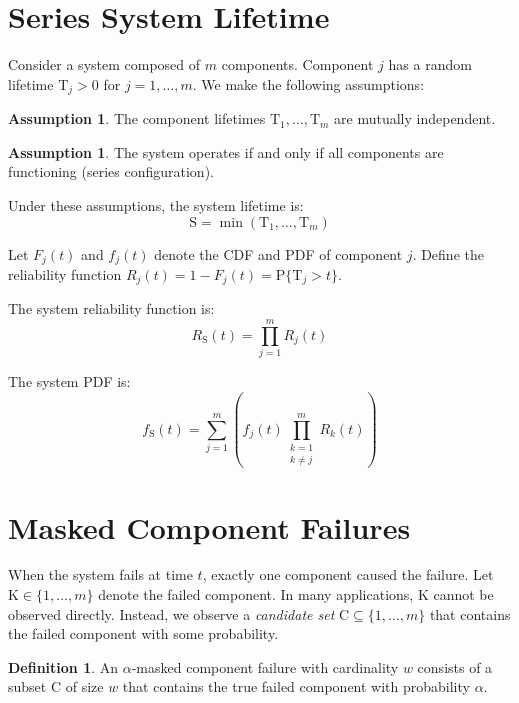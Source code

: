 \documentclass[12pt]{article}
\newcommand{\RV}[1]{\mathrm{#1}}
\newcommand{\Prob}[1]{\mathrm{P}\{#1\}}
\newcommand{\cv}{\RV{T}}           %
\newcommand{\sv}{\RV{S}}           %
\newcommand{\cand}{\RV{C}}         %
\newcommand{\pdf}{f}
\newcommand{\cdf}{F}
\newcommand{\srv}{R}
\newcommand{\spdf}{\pdf_{\sv}}
\theoremstyle{definition}
\newtheorem{definition}[theorem]{Definition}
\newtheorem{assumption}[theorem]{Assumption}
\begin{document}
\section{Series System Lifetime}

Consider a system composed of $m$ components. Component $j$ has a random lifetime $\cv_j > 0$ for $j = 1, \ldots, m$. We make the following assumptions:

\begin{assumption}
\label{asm:indep}
The component lifetimes $\cv_1, \ldots, \cv_m$ are mutually independent.
\end{assumption}

\begin{assumption}
The system operates if and only if all components are functioning (series configuration).
\end{assumption}

Under these assumptions, the system lifetime is:
\begin{equation}
\label{eq:system_lifetime}
\sv = \min(\cv_1, \ldots, \cv_m)
\end{equation}

Let $\cdf_j(t)$ and $\pdf_j(t)$ denote the CDF and PDF of component $j$. Define the reliability function $\srv_j(t) = 1 - \cdf_j(t) = \Prob{\cv_j > t}$.

The system reliability function is:
\begin{equation}
\label{eq:system_reliability}
\srv_{\sv}(t) = \prod_{j=1}^{m} \srv_j(t)
\end{equation}

The system PDF is:
\begin{equation}
\label{eq:system_pdf}
\spdf(t) = \sum_{j=1}^{m} \left(\pdf_j(t) \prod_{\substack{k=1\\k \neq j}}^{m} \srv_k(t)\right)
\end{equation}

\section{Masked Component Failures}

When the system fails at time $t$, exactly one component caused the failure. Let $\RV{K} \in \{1, \ldots, m\}$ denote the failed component. In many applications, $\RV{K}$ cannot be observed directly. Instead, we observe a \emph{candidate set} $\cand \subseteq \{1, \ldots, m\}$ that contains the failed component with some probability.

\begin{definition}
An $\alpha$-masked component failure with cardinality $w$ consists of a subset $\cand$ of size $w$ that contains the true failed component with probability $\alpha$.
\end{definition}
\end{document}
